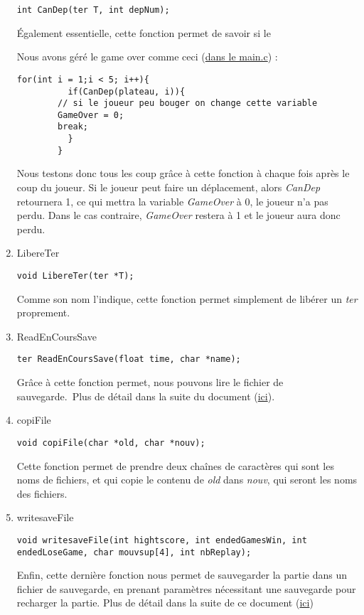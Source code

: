 \documentclass[letter]{article}
\begin{document}
\begin{enumerate}
\begin{verbatim}
int CanDep(ter T, int depNum);
\end{verbatim}

Également essentielle, cette fonction permet de savoir si le

Nous avons géré le game over comme ceci (\href{main.c}{dans le main.c}) :
\begin{verbatim}
for(int i = 1;i < 5; i++){
	      if(CanDep(plateau, i)){
		// si le joueur peu bouger on change cette variable
		GameOver = 0;
		break;
	      }
	    }
\end{verbatim}

Nous testons donc tous les coup grâce à cette fonction à chaque fois après le coup du joueur. Si le joueur peut faire un déplacement, alors \emph{CanDep} retournera 1, ce qui mettra la variable \emph{GameOver} à 0, le joueur n'a pas perdu. Dans le cas contraire, \emph{GameOver} restera à 1 et le joueur aura donc perdu.

\item LibereTer
\label{sec:orga1798dd}

\begin{verbatim}
void LibereTer(ter *T);
\end{verbatim}

Comme son nom l'indique, cette fonction permet simplement de libérer un \emph{ter} proprement.

\item ReadEnCoursSave
\label{sec:org2ded51b}


\begin{verbatim}
ter ReadEnCoursSave(float time, char *name);
\end{verbatim}


Grâce à cette fonction permet, nous pouvons lire le fichier de sauvegarde. Plus de détail dans la suite du document (\hyperref[sec:orgcf11b20]{ici}).

\item copiFile
\label{sec:orga17698c}

\begin{verbatim}
void copiFile(char *old, char *nouv);
\end{verbatim}

Cette fonction permet de prendre deux chaînes de caractères qui sont les noms de fichiers, et qui copie le contenu de \emph{old} dans \emph{nouv}, qui seront les noms des fichiers.

\item writesaveFile
\label{sec:orga53634a}


\begin{verbatim}
void writesaveFile(int hightscore, int endedGamesWin, int endedLoseGame, char mouvsup[4], int nbReplay);
\end{verbatim}

Enfin, cette dernière fonction nous permet de sauvegarder la partie dans un fichier de sauvegarde, en prenant paramètres nécessitant une sauvegarde pour recharger la partie. Plus
de détail dans la suite de ce document (\hyperref[sec:orgcf11b20]{ici})
\end{enumerate}
\end{document}
